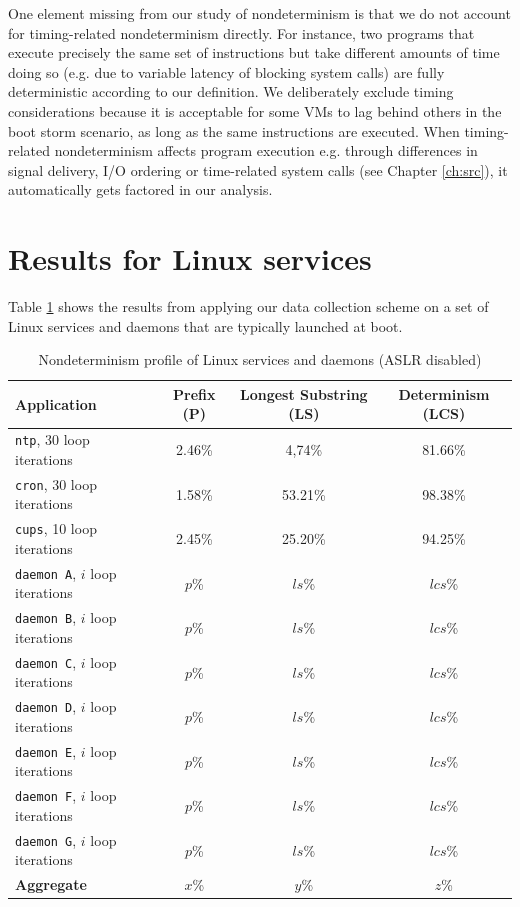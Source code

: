 One element missing from our study of nondeterminism is that
we do not account for timing-related
nondeterminism directly. For instance, two programs
that execute precisely the same set of instructions but 
take different amounts of time doing so (e.g. due
to variable latency of blocking system calls) are
fully deterministic according to our definition.
We deliberately exclude timing considerations because
it is acceptable for some VMs to lag behind others in the boot storm
scenario, as long as the same instructions are executed.
When timing-related nondeterminism affects program execution
e.g. through differences in signal delivery, I/O ordering
or time-related system calls (see Chapter \ref{ch:src}),
it automatically gets factored in our analysis.

\section{Results for Linux services} \label{bootresults}
Table \ref{linux:stats} shows the results from applying our data
collection scheme on a set of Linux services and daemons
that are typically launched at boot. \newline

\begin{table}[h]
\begin{center}
\begin{tabular}{||l|c|c|c||}\hline
  Application & Prefix (P) & Longest Substring (LS) &
  Determinism (LCS) \\
  \hline \hline
  \texttt{ntp}, 30 loop iterations & 2.46\% & 4,74\% & 81.66\%
  \\\hline
  \texttt{cron}, 30 loop iterations & 1.58\% & 53.21\% & 98.38\% 
  \\\hline 
  \texttt{cups}, 10 loop iterations & 2.45\% & 25.20\% & 94.25\%
  \\\hline 
  \texttt{daemon A}, $i$ loop iterations & $p$\% & $ls$\% & $lcs$\%
  \\\hline 
  \texttt{daemon B}, $i$ loop iterations & $p$\% & $ls$\% & $lcs$\%
  \\\hline 
  \texttt{daemon C}, $i$ loop iterations & $p$\% & $ls$\% & $lcs$\%
  \\\hline 
  \texttt{daemon D}, $i$ loop iterations & $p$\% & $ls$\% & $lcs$\%
  \\\hline 
  \texttt{daemon E}, $i$ loop iterations & $p$\% & $ls$\% & $lcs$\%
  \\\hline 
  \texttt{daemon F}, $i$ loop iterations & $p$\% & $ls$\% & $lcs$\%
  \\\hline 
  \texttt{daemon G}, $i$ loop iterations & $p$\% & $ls$\% & $lcs$\%
  \\\hline 
  \hline 
  {\bf Aggregate} & {\bf $x$}\% & {\bf $y$}\% & {\bf $z$}\%
  \\\hline 
\end{tabular}
\caption{Nondeterminism profile of Linux services and daemons (ASLR disabled)}
\label{linux:stats}
\end{center}
\end{table}

